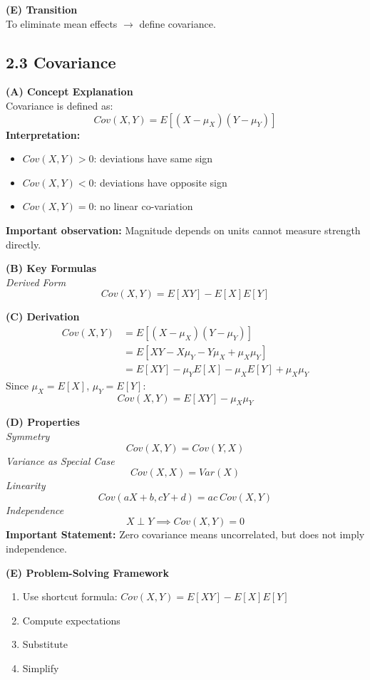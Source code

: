 \documentclass[12pt]{article}
\begin{document}
\textbf{(E) Transition} \\
To eliminate mean effects $\rightarrow$ define covariance.

\hrulefill

\subsection*{2.3 Covariance}

\textbf{(A) Concept Explanation} \\
Covariance is defined as:
\[ \boxed{Cov(X,Y)=E[(X-\mu_{X})(Y-\mu_{Y})]} \]
\textbf{Interpretation:}
\begin{itemize}[noitemsep]
    \item $Cov(X,Y)>0$: deviations have same sign
    \item $Cov(X,Y)<0$: deviations have opposite sign
    \item $Cov(X,Y)=0$: no linear co-variation
\end{itemize}
\textbf{Important observation:} Magnitude depends on units cannot measure strength directly.

\textbf{(B) Key Formulas} \\
\textit{Derived Form}
\[ \boxed{Cov(X,Y)=E[XY]-E[X]E[Y]} \]

\textbf{(C) Derivation} 
\begin{align*}
Cov(X,Y) &= E[(X-\mu_{X})(Y-\mu_{Y})] \\
&= E[XY-X\mu_{Y}-Y\mu_{X}+\mu_{X}\mu_{Y}] \\
&= E[XY]-\mu_{Y}E[X]-\mu_{X}E[Y]+\mu_{X}\mu_{Y}
\end{align*}
Since $\mu_{X}=E[X]$, $\mu_{Y}=E[Y]$:
\[ Cov(X,Y) = E[XY]-\mu_{X}\mu_{Y} \]

\textbf{(D) Properties} \\
\textit{Symmetry}
\[ \boxed{Cov(X,Y)=Cov(Y,X)} \]
\textit{Variance as Special Case}
\[ \boxed{Cov(X,X)=Var(X)} \]
\textit{Linearity}
\[ \boxed{Cov(aX+b,cY+d)=ac~Cov(X,Y)} \]
\textit{Independence}
\[ \boxed{X \perp Y \implies Cov(X,Y)=0} \]
\textbf{Important Statement:} Zero covariance means uncorrelated, but does not imply independence.

\textbf{(E) Problem-Solving Framework}
\begin{enumerate}[noitemsep]
    \item Use shortcut formula: $Cov(X,Y)=E[XY]-E[X]E[Y]$
    \item Compute expectations
    \item Substitute
    \item Simplify
\end{enumerate}
\end{document}

